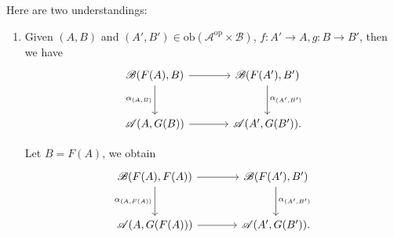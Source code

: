  \begin{remark}
   Here are two understandings:
   \begin{enumerate}
     \item
 Given $(A,B)$ and $(A',B') \in \mathrm{ob}\left( \mathscr{A}^{\mathrm{op}}\times \mathscr{B} \right) $, $f:A'\to A, g:B\to B'$, then we have
 \[
   \begin{tikzcd}[row sep = large, column sep =large]
   \mathscr{B}(F(A),B)\arrow[d,"\alpha_{(A,B)}"'] \arrow[r] & \mathscr{B}(F(A'),B')\arrow[d,"\alpha_{(A',B')}"]\\
   \mathscr{A}(A,G(B))\arrow[r] & \mathscr{A}(A',G(B')). 
 \end{tikzcd}
 \] 

 Let $B=F(A)$, we obtain
 \[
   \begin{tikzcd}[row sep = large, column sep =large]
     \mathscr{B}(F(A),F(A))\arrow[d,"\alpha_{(A,F(A))}"'] \arrow[r] & \mathscr{B}(F(A'),B')\arrow[d,"\alpha_{(A',B')}"]\\
     \mathscr{A}(A,G(F(A)))\arrow[r] & \mathscr{A}(A',G(B')). 
 \end{tikzcd}
 \]


\end{enumerate}
\end{remark}
